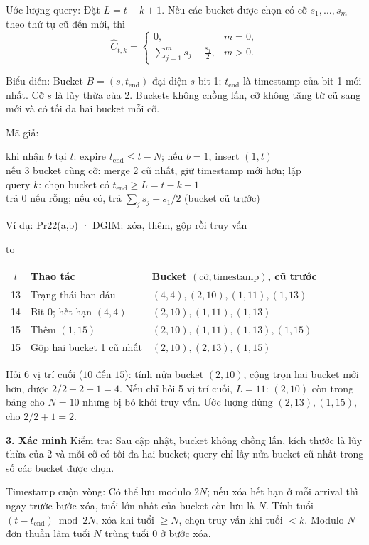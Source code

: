\documentclass[10pt,a4paper,twocolumn]{article}
\makeatletter
\newcommand{\key}[1]{#1:\enspace}
\newcommand{\blocklabel}[1]{\par\noindent#1\par\nobreak}
\newcommand{\qlink}[2]{\hyperref[question:#1]{#2}}
\newenvironment{example}[2]{%
  \par\addvspace{6pt}\noindent
  \raggedright
  \blocklabel{Ví dụ: \qlink{#1}{#2}}%
}{\par\addvspace{4pt}}
\newenvironment{examtable}[1]{%
  \par\addvspace{2pt}\noindent\hbox to \linewidth\bgroup\hfil
  \setlength{\tabcolsep}{4pt}%
  \renewcommand{\arraystretch}{1.12}\begin{tabular}{#1}%
}{\end{tabular}\hfil\egroup\par\addvspace{2pt}}
\newcommand{\unitheading}[2]{%
  \par\addvspace{1pt}\noindent\textbf{#1. #2}\enspace}
\newcommand{\unitverification}{\unitheading{3}{Xác minh}}
\newenvironment{algpseudo}{%
  \par\addvspace{2pt}\noindent
  \setlength{\parskip}{0pt}%
  Mã giả:\par\nobreak
  \begin{list}{}{\setlength{\leftmargin}{1em}\setlength{\topsep}{0pt}%
    \setlength{\partopsep}{0pt}\setlength{\parsep}{0pt}%
    \@beginparpenalty=10000\relax}%
  \item\relax
}{\end{list}\par\addvspace{3pt}}
\makeatother
\begin{document}
\key{Ước lượng query} Đặt $L=t-k+1$. Nếu các bucket được chọn có cỡ $s_1,\ldots,s_m$ theo thứ tự cũ đến mới, thì
\[
\widehat C_{t,k}=\begin{cases}0,&m=0,\\[2pt]\displaystyle\sum_{j=1}^{m}s_j-\frac{s_1}{2},&m>0.\end{cases}
\]

\key{Biểu diễn} Bucket $B=(s,t_{\mathrm{end}})$ đại diện $s$ bit 1; $t_{\mathrm{end}}$ là timestamp của bit 1 mới nhất. Cỡ $s$ là lũy thừa của 2. Buckets không chồng lấn, cỡ không tăng từ cũ sang mới và có tối đa hai bucket mỗi cỡ.

\begin{algpseudo}
khi nhận $b$ tại $t$: expire $t_{\mathrm{end}}\le t-N$; nếu $b=1$, insert $(1,t)$\\
nếu 3 bucket cùng cỡ: merge 2 cũ nhất, giữ timestamp mới hơn; lặp\\
query $k$: chọn bucket có $t_{\mathrm{end}}\ge L=t-k+1$\\
trả 0 nếu rỗng; nếu có, trả $\sum_j s_j-s_1/2$ (bucket cũ trước)
\end{algpseudo}

\begin{example}{Pr22}{Pr22(a,b) · DGIM: xóa, thêm, gộp rồi truy vấn}
\begin{examtable}{@{}c l l@{}}
\toprule
$t$ & Thao tác & Bucket $(\text{cỡ},\text{timestamp})$, cũ trước \\
\midrule
13 & Trạng thái ban đầu & $(4,4), (2,10), (1,11), (1,13)$ \\
14 & Bit 0; hết hạn $(4,4)$ & $(2,10), (1,11), (1,13)$ \\
15 & Thêm $(1,15)$ & $(2,10), (1,11), (1,13), (1,15)$ \\
15 & Gộp hai bucket 1 cũ nhất & $(2,10), (2,13), (1,15)$ \\
\bottomrule
\end{examtable}
Hỏi 6 vị trí cuối ($10$ đến $15$): tính nửa bucket $(2,10)$, cộng trọn hai bucket mới hơn, được $2/2+2+1=4$.
Nếu chỉ hỏi 5 vị trí cuối, $L=11$: $(2,10)$ còn trong bảng cho $N=10$ nhưng bị bỏ khỏi truy vấn. Ước lượng dùng $(2,13),(1,15)$, cho $2/2+1=2$.
\end{example}

\unitverification
\key{Kiểm tra} Sau cập nhật, bucket không chồng lấn, kích thước là lũy thừa của 2 và mỗi cỡ có tối đa hai bucket; query chỉ lấy nửa bucket cũ nhất trong số các bucket được chọn.

\key{Timestamp cuộn vòng} Có thể lưu modulo $2N$; nếu xóa hết hạn ở mỗi arrival thì ngay trước bước xóa, tuổi lớn nhất của bucket còn lưu là $N$. Tính tuổi $(t-t_{\mathrm{end}})\bmod 2N$, xóa khi tuổi $\ge N$, chọn truy vấn khi tuổi $<k$. Modulo $N$ đơn thuần làm tuổi $N$ trùng tuổi 0 ở bước xóa.
\end{document}
